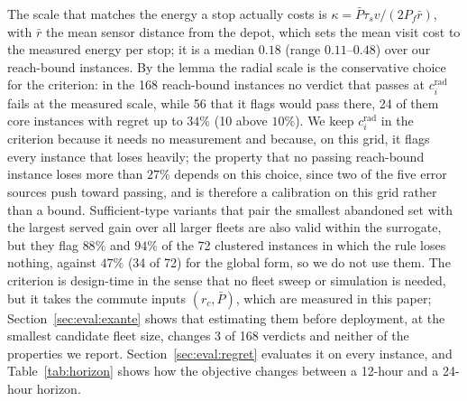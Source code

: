 \documentclass[journal,outdir=./]{IEEEtran}
\newcommand{\rc}{r_{c}}
\newcommand{\Pbar}{\bar{P}}
\newcommand{\Pf}{P_{f}}
\begin{document}
The scale that matches the energy a stop actually costs is $\kappa=\Pbar\tau_s v/(2\Pf\bar r)$, with $\bar r$ the mean sensor distance from the depot, which sets the mean visit cost to the measured energy per stop; it is a median $0.18$ (range $0.11$--$0.48$) over our reach-bound instances. By the lemma the radial scale is the conservative choice for the criterion: in the 168 reach-bound instances no verdict that passes at $c_i^{\mathrm{rad}}$ fails at the measured scale, while 56 that it flags would pass there, 24 of them core instances with regret up to $34\%$ (10 above $10\%$). We keep $c_i^{\mathrm{rad}}$ in the criterion because it needs no measurement and because, on this grid, it flags every instance that loses heavily; the property that no passing reach-bound instance loses more than $27\%$ depends on this choice, since two of the five error sources push toward passing, and is therefore a calibration on this grid rather than a bound. Sufficient-type variants that pair the smallest abandoned set with the largest served gain over all larger fleets are also valid within the surrogate, but they flag $88\%$ and $94\%$ of the 72 clustered instances in which the rule loses nothing, against $47\%$ (34 of 72) for the global form, so we do not use them. The criterion is design-time in the sense that no fleet sweep or simulation is needed, but it takes the commute inputs $(\rc,\Pbar)$, which are measured in this paper; Section~\ref{sec:eval:exante} shows that estimating them before deployment, at the smallest candidate fleet size, changes 3 of 168 verdicts and neither of the properties we report. Section~\ref{sec:eval:regret} evaluates it on every instance, and Table~\ref{tab:horizon} shows how the objective changes between a 12-hour and a 24-hour horizon.
\end{document}
